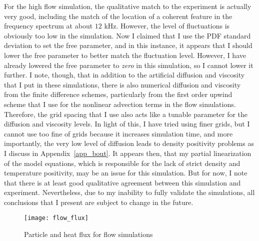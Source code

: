 For the high flow simulation, the qualitative match to the experiment is actually very good, including the match of the location of a coherent feature in the frequency spectrum at about $12$ kHz. 
However, the level of fluctuations is obviously too low in the simulation. Now I claimed that I use
the PDF standard deviation to set the free parameter, and in this instance, it appears that I should lower the free parameter to better match the fluctuation level. However, I have already
lowered the free parameter to \emph{zero} in this simulation, so I cannot lower it further. I note, though, that in addition to the artificial diffusion and viscosity that I put in these simulations,
there is also numerical diffusion and viscosity from the finite difference schemes, particularly from the first order upwind scheme that I use for the nonlinear advection terms in the flow
simulations. Therefore, the grid spacing that I use also acts like a tunable parameter for the diffusion and viscosity levels. In light of this, I have tried using finer grids, but I cannot
use too fine of grids because it increases simulation time, and more importantly, the very low level of diffusion leads to density positivity problems as I discuss in Appendix~\ref{app_bout}.
It appears then, that my partial linearization of the model equations, which is responsible for the lack of strict density and temperature positivity, may be an issue for this simulation.
But for now, I note that there is at least good qualitative agreement between this simulation and experiment. Nevertheless, due to my inability to fully validate the simulations, all conclusions
that I present are subject to change in the future.

\begin{figure}
\centerline{\texttt{[image: flow\_flux]}}
\caption{Particle and heat flux for flow simulations}
\label{flow_flux}
\end{figure}

